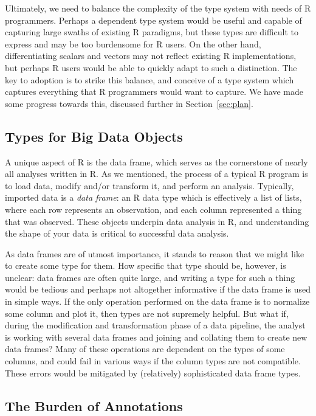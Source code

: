 \documentclass[sigplan,10pt,review,anonymous]{acmart}\settopmatter{printfolios=true,printccs=false,printacmref=false}
\begin{document}
Ultimately, we need to balance the complexity of the type system with needs of R programmers.
Perhaps a dependent type system would be useful and capable of capturing large swaths of existing R paradigms, but these types are difficult to express and may be too burdensome for R users. 
On the other hand, differentiating scalars and vectors may not reflect existing R implementations, but perhaps R users would be able to quickly adapt to such a distinction.
The key to adoption is to strike this balance, and conceive of a type system which captures everything that R programmers would want to capture. 
We have made some progress towards this, discussed further in Section~\ref{sec:plan}.

%
%
\subsection{Types for Big Data Objects}

A unique aspect of R is the data frame, which serves as the cornerstone of nearly all analyses written in R.
As we mentioned, the process of a typical R program is to load data, modify and/or transform it, and perform an analysis.
Typically, imported data is a {\it data frame}: an R data type which is effectively a list of lists, where each row represents an observation, and each column represented a thing that was observed. 
These objects underpin data analysis in R, and understanding the shape of your data is critical to successful data analysis.

As data frames are of utmost importance, it stands to reason that we might like to create some type for them.
How specific that type should be, however, is unclear: data frames are often quite large, and writing a type for such a thing would be tedious and perhaps not altogether informative if the data frame is used in simple ways.
If the only operation performed on the data frame is to normalize some column and plot it, then types are not supremely helpful.
But what if, during the modification and transformation phase of a data pipeline, the analyst is working with several data frames and joining and collating them to create new data frames?
Many of these operations are dependent on the types of some columns, and could fail in various ways if the column types are not compatible.
These errors would be mitigated by (relatively) sophisticated data frame types.

%
%
\subsection{The Burden of Annotations}
\end{document}
